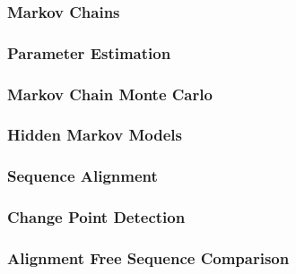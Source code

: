 \documentclass[12pt,a4paper]{article}
\begin{document}
            

            \subsubsection{Markov Chains}
            
            
            \subsubsection{Parameter Estimation}
            
            
            \subsubsection{Markov Chain Monte Carlo}
            
            
            \subsubsection{Hidden Markov Models}
             
            
            \subsubsection{Sequence Alignment}
            
            
            \subsubsection{Change Point Detection}
            
            
            
            \subsubsection{Alignment Free Sequence Comparison}
            
            
            
            
\end{document}
